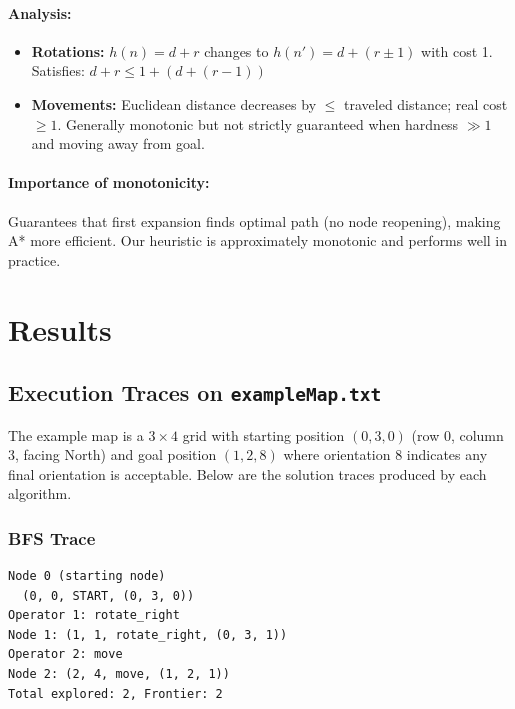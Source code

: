 \documentclass[11pt,a4paper]{article}
\begin{document}
\paragraph{Analysis:}
\begin{itemize}[leftmargin=1.5cm,itemsep=0.1em]
    \item \textbf{Rotations:} $h(n) = d + r$ changes to $h(n') = d + (r \pm 1)$ with cost 1. Satisfies: $d + r \leq 1 + (d + (r-1))$ \checkmark
    \item \textbf{Movements:} Euclidean distance decreases by $\leq$ traveled distance; real cost $\geq 1$. Generally monotonic but not strictly guaranteed when hardness $\gg 1$ and moving away from goal.
\end{itemize}

\paragraph{Importance of monotonicity:}
Guarantees that first expansion finds optimal path (no node reopening), making A* more efficient. Our heuristic is approximately monotonic and performs well in practice.

\section{Results}

\subsection{Execution Traces on \texttt{exampleMap.txt}}

The example map is a $3 \times 4$ grid with starting position $(0, 3, 0)$ (row 0, column 3, facing North) and goal position $(1, 2, 8)$ where orientation 8 indicates any final orientation is acceptable. Below are the solution traces produced by each algorithm.

\subsubsection{BFS Trace}
\begin{lstlisting}[basicstyle=\ttfamily\tiny]
Node 0 (starting node)
  (0, 0, START, (0, 3, 0))
Operator 1: rotate_right
Node 1: (1, 1, rotate_right, (0, 3, 1))
Operator 2: move
Node 2: (2, 4, move, (1, 2, 1))
Total explored: 2, Frontier: 2
\end{lstlisting}
\end{document}
